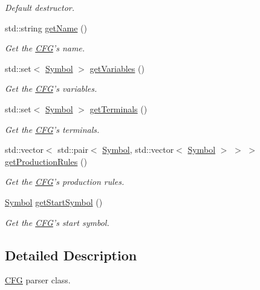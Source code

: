 \begin{DoxyCompactItemize}
\begin{DoxyCompactList}\small\item\em \-Default destructor. \end{DoxyCompactList}\item 
std\-::string \hyperlink{class_c_f_g_parser_ab3784554791bfe3ab0149740a8b8f4bf}{get\-Name} ()
\begin{DoxyCompactList}\small\item\em \-Get the \hyperlink{class_c_f_g}{\-C\-F\-G}'s name. \end{DoxyCompactList}\item 
std\-::set$<$ \hyperlink{class_symbol}{\-Symbol} $>$ \hyperlink{class_c_f_g_parser_a0f08bc78b2d4e8b7a549bc7c64f2620a}{get\-Variables} ()
\begin{DoxyCompactList}\small\item\em \-Get the \hyperlink{class_c_f_g}{\-C\-F\-G}'s variables. \end{DoxyCompactList}\item 
std\-::set$<$ \hyperlink{class_symbol}{\-Symbol} $>$ \hyperlink{class_c_f_g_parser_a4a757c79a5857ad9caab4bd5074dce41}{get\-Terminals} ()
\begin{DoxyCompactList}\small\item\em \-Get the \hyperlink{class_c_f_g}{\-C\-F\-G}'s terminals. \end{DoxyCompactList}\item 
std\-::vector$<$ std\-::pair$<$ \hyperlink{class_symbol}{\-Symbol}, \*
std\-::vector$<$ \hyperlink{class_symbol}{\-Symbol} $>$ $>$ $>$ \hyperlink{class_c_f_g_parser_a64ef1b6051613fcd51e58e5e2697944e}{get\-Production\-Rules} ()
\begin{DoxyCompactList}\small\item\em \-Get the \hyperlink{class_c_f_g}{\-C\-F\-G}'s production rules. \end{DoxyCompactList}\item 
\hyperlink{class_symbol}{\-Symbol} \hyperlink{class_c_f_g_parser_a939779878c686fe49ab6129bd73b1aea}{get\-Start\-Symbol} ()
\begin{DoxyCompactList}\small\item\em \-Get the \hyperlink{class_c_f_g}{\-C\-F\-G}'s start symbol. \end{DoxyCompactList}\end{DoxyCompactItemize}


\subsection{\-Detailed \-Description}
\hyperlink{class_c_f_g}{\-C\-F\-G} parser class. 

